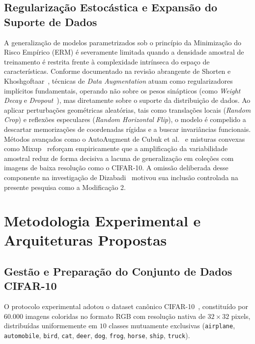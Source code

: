 \documentclass[runningheads]{llncs}
\begin{document}
\subsection{Regulariza\c{c}\~{a}o Estoc\'{a}stica e Expans\~{a}o do Suporte de Dados}
A generaliza\c{c}\~{a}o de modelos parametrizados sob o princ\'{i}pio da Minimiza\c{c}\~{a}o do Risco Emp\'{i}rico (ERM) \'{e} severamente limitada quando a densidade amostral de treinamento \'{e} restrita frente \`{a} complexidade intr\'{i}nseca do espa\c{c}o de caracter\'{i}sticas. Conforme documentado na revis\~{a}o abrangente de Shorten e Khoshgoftaar~\cite{shorten2019survey}, t\'{e}cnicas de \textit{Data Augmentation} atuam como regularizadores impl\'{i}citos fundamentais, operando n\~{a}o sobre os pesos sin\'{a}pticos (como \textit{Weight Decay} e \textit{Dropout}~\cite{srivastava2014dropout}), mas diretamente sobre o suporte da distribui\c{c}\~{a}o de dados. Ao aplicar perturba\c{c}\~{o}es geom\'{e}tricas aleat\'{o}rias, tais como transla\c{c}\~{o}es locais (\textit{Random Crop}) e reflex\~{o}es especulares (\textit{Random Horizontal Flip}), o modelo \'{e} compelido a descartar memoriza\c{c}\~{o}es de coordenadas r\'{i}gidas e a buscar invari\^{a}ncias funcionais. M\'{e}todos avan\c{c}ados como o AutoAugment de Cubuk et al.~\cite{cubuk2019autoaugment} e misturas convexas como Mixup~\cite{zhang2018mixup} refor\c{c}am empiricamente que a amplifica\c{c}\~{a}o da variabilidade amostral reduz de forma decisiva a lacuna de generaliza\c{c}\~{a}o em cole\c{c}\~{o}es com imagens de baixa resolu\c{c}\~{a}o como o CIFAR-10. A omiss\~{a}o deliberada desse componente na investiga\c{c}\~{a}o de Dizabadi~\cite{dizabadi2026empirical} motivou sua inclus\~{a}o controlada na presente pesquisa como a Modifica\c{c}\~{a}o 2.

\section{Metodologia Experimental e Arquiteturas Propostas}
\label{sec:metodologia}

\subsection{Gest\~{a}o e Prepara\c{c}\~{a}o do Conjunto de Dados CIFAR-10}
O protocolo experimental adotou o dataset can\^{o}nico CIFAR-10~\cite{krizhevsky2009learning}, constitu\'{i}do por $60.000$ imagens coloridas no formato RGB com resolu\c{c}\~{a}o nativa de $32 \times 32$ pixels, distribu\'{i}das uniformemente em $10$ classes mutuamente exclusivas (\texttt{airplane}, \texttt{automobile}, \texttt{bird}, \texttt{cat}, \texttt{deer}, \texttt{dog}, \texttt{frog}, \texttt{horse}, \texttt{ship}, \texttt{truck}).
\end{document}
